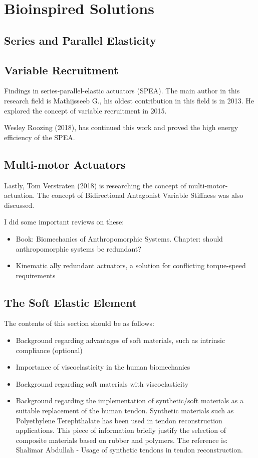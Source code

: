 \section{Bioinspired Solutions}
\subsection{Series and Parallel Elasticity}
\subsection{Variable Recruitment}

Findings in series-parallel-elastic actuators (SPEA). The main author in this research field is  Mathijsseeb G., his oldest contribution in this field is in 2013. He explored the concept of variable recruitment in 2015.

Wesley Roozing (2018), has continued this work and proved the high energy efficiency of the SPEA.

\subsection{Multi-motor Actuators}

Lastly, Tom Verstraten (2018) is researching the concept of multi-motor-actuation. The concept of Bidirectional Antagonist Variable Stiffness was also discussed.

I did some important reviews on these:
\begin{itemize}
    \item Book: Biomechanics of Anthropomorphic Systems. Chapter:  should anthropomorphic systems be redundant?
    \item Kinematic ally redundant actuators, a solution for conflicting torque-speed requirements
\end{itemize}

\subsection{The Soft Elastic Element}
The contents of this section should be as follows:
\begin{itemize}
    \item Background regarding advantages of soft materials, such as intrinsic compliance (optional)
    \item Importance of viscoelasticity in the human biomechanics
    \item Background regarding soft materials with viscoelasticity
    \item Background regarding the implementation of synthetic/soft materials as a suitable replacement of the human tendon. Synthetic materials such as Polyethylene Terephthalate has been used in tendon reconstruction applications. This piece of information briefly justify the selection of composite materials based on rubber and polymers. The reference is: Shalimar Abdullah - Usage of synthetic tendons in tendon reconstruction.
\end{itemize}

